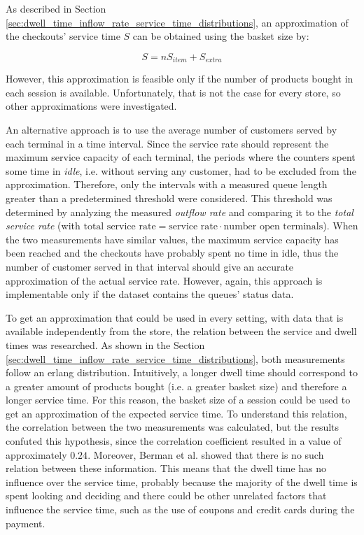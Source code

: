 As described in Section \ref{sec:dwell_time_inflow_rate_service_time_distributions}, an approximation of the checkouts' service time \( S \) can be obtained using the basket size by:

\begin{equation}
  S = n S_{item} + S_{extra}
\end{equation}

However, this approximation is feasible only if the number of products bought in each session is available. Unfortunately, that is not the case for every store, so other approximations were investigated.

An alternative approach is to use the average number of customers served by each terminal in a time interval. Since the service rate should represent the maximum service capacity of each terminal, the periods where the counters spent some time in \emph{idle}, i.e. without serving any customer, had to be excluded from the approximation. Therefore, only the intervals with a measured queue length greater than a predetermined threshold were considered. This threshold was determined by analyzing the measured \emph{outflow rate} and comparing it to the \emph{total service rate} (with \(\text{total service rate} = \text{service rate} \cdot \text{number open terminals} \)). When the two measurements have similar values, the maximum service capacity has been reached and the checkouts have probably spent no time in idle, thus the number of customer served in that interval should give an accurate approximation of the actual service rate. However, again, this approach is implementable only if the dataset contains the queues’ status data.

To get an approximation that could be used in every setting, with data that is available independently from the store, the relation between the service and dwell times was researched. As shown in the Section \ref{sec:dwell_time_inflow_rate_service_time_distributions}, both measurements follow an erlang distribution. Intuitively, a longer dwell time should correspond to a greater amount of products bought (i.e. a greater basket size) and therefore a longer service time. For this reason, the basket size of a session could be used to get an approximation of the expected service time. To understand this relation, the correlation between the two measurements was calculated, but the results confuted this hypothesis, since the correlation coefficient resulted in a value of approximately \( 0.24 \). Moreover, Berman et al. \cite{berman} showed that there is no such relation between these information. This means that the dwell time has no influence over the service time, probably because the majority of the dwell time is spent looking and deciding and there could be other unrelated factors that influence the service time, such as the use of coupons and credit cards during the payment.


